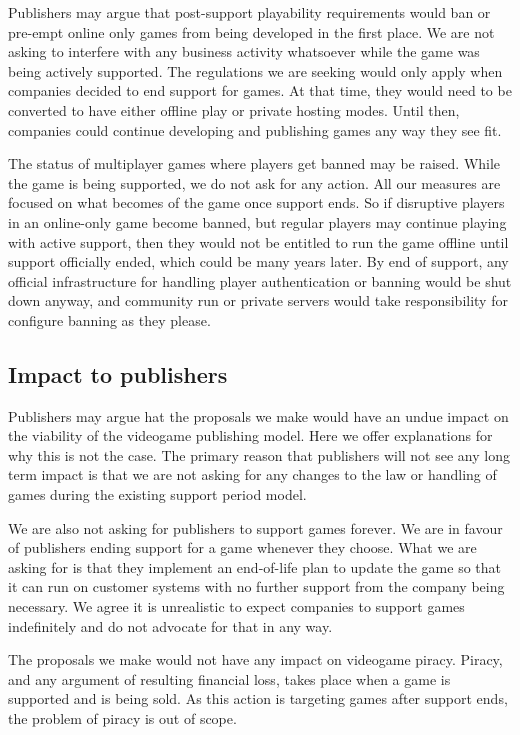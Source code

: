 Publishers may argue that post-support playability requirements would ban or pre-empt online only games from being developed in the first place.
We are not asking to interfere with any business activity whatsoever while the game was being actively supported.
The regulations we are seeking would only apply when companies decided to end support for games.
At that time, they would need to be converted to have either offline play or private hosting modes.
Until then, companies could continue developing and publishing games any way they see fit.

The status of multiplayer games where players get banned may be raised.
While the game is being supported, we do not ask for any action.
All our measures are focused on what becomes of the game once support ends.
So if disruptive players in an online-only game become banned, but regular players may continue playing with active support,
then they would not be entitled to run the game offline until support officially ended, which could be many years later\cn.
By end of support, any official infrastructure for handling player authentication or banning would be shut down anyway,
and community run or private servers would take responsibility for configure banning as they please.

\subsection{Impact to publishers}
Publishers may argue hat the proposals we make would have an undue impact on the viability of the videogame publishing model.
Here we offer explanations for why this is not the case.
The primary reason that publishers will not see any long term impact is that we are not asking for any changes to the law or handling of games during the existing support period model.

We are also not asking for publishers to support games forever.
We are in favour of publishers ending support for a game whenever they choose.
What we are asking for is that they implement an end-of-life plan to \gls{update} the game
so that it can run on customer systems with no further support from the company being necessary.
We agree it is unrealistic to expect companies to support games indefinitely and do not advocate for that in any way.

The proposals we make would not have any impact on videogame piracy.
Piracy, and any argument of resulting financial loss, takes place when a game is supported and is being sold\cn.
As this action is targeting games after support ends, the problem of piracy is out of scope.

